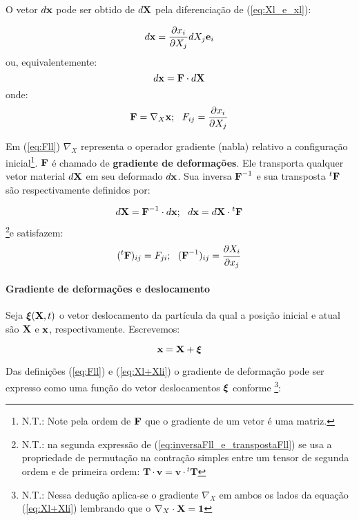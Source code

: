 \documentclass[
	11pt, %
	fleqn, %
	a4paper, %
]{LegrandOrangeBook}
\begin{document}
O vetor $d\textbf{x}$ pode ser obtido de $d\textbf{X}$ pela diferenciação de (\ref{eq:Xl_e_xl}):

\begin{equation}
	\label{eq:dx_indicial}	
	d\textbf{x} = \dfrac{\partial x_i}{\partial X_j}dX_j\textbf{e}_i
\end{equation}
ou, equivalentemente:
\begin{equation}
	\label{eq:dx}	
	d\textbf{x} = \textbf{F} \cdot d\textbf{X}
\end{equation}
onde:
\begin{equation}
	\label{eq:Fll}	
	\textbf{F} = \nabla_X \textbf{x} ; ~~ F_{ij} = \dfrac{\partial x_i}{\partial X_j}
\end{equation}

Em (\ref{eq:Fll}) $\nabla_X$ representa o operador gradiente (nabla) relativo a configuração inicial\footnote{N.T.: Note pela ordem de $\textbf{F}$ que o gradiente de um vetor é uma matriz.}. $\textbf{F}$ é chamado de \textbf{gradiente de deformações}. Ele transporta qualquer vetor material $d\textbf{X}$ em seu deformado $d\textbf{x}$. Sua inversa $\textbf{F}^{-1}$ e sua transposta ${}^t \textbf{F}$ são respectivamente definidos por:

\begin{equation}
	\label{eq:inversaFll_e_transpostaFll}	
	d\textbf{X} = \textbf{F}^{-1} \cdot d\textbf{x}; ~~ d\textbf{x} = d\textbf{X} \cdot {}^t\textbf{F}
\end{equation}
\footnote{N.T.: na segunda expressão de (\ref{eq:inversaFll_e_transpostaFll}) se usa a propriedade de permutação na contração simples entre um tensor de segunda ordem e de primeira ordem: $\textbf{T} \cdot \textbf{v} = \textbf{v} \cdot {}^t\textbf{T}$}e satisfazem:
\begin{equation}
	\label{eq:inversaFll_e_transpostaFll2}	
	({}^t\textbf{F})_{ij} = F_{ji}; ~~(\textbf{F}^{-1})_{ij} = \dfrac{\partial X_i}{\partial x_j}
\end{equation}

\paragraph{Gradiente de deformações e deslocamento} Seja $\bm{\xi}(\textbf{X},t)$ o vetor deslocamento da partícula da qual a posição inicial e atual são $\textbf{X}$ e $\textbf{x}$, respectivamente. Escrevemos:

\begin{equation}
	\label{eq:Xl+Xli}	
	\textbf{x} = \textbf{X} + \bm{\xi}
\end{equation}

Das definições (\ref{eq:Fll}) e (\ref{eq:Xl+Xli}) o gradiente de deformação pode ser expresso como uma função do vetor deslocamentos $\bm{\xi}$ conforme \footnote{N.T.: Nessa dedução aplica-se o gradiente $\nabla_X$ em ambos os lados da equação (\ref{eq:Xl+Xli}) lembrando que o $\nabla_X \cdot \textbf{X} = \bm{1}$}:
\end{document}
